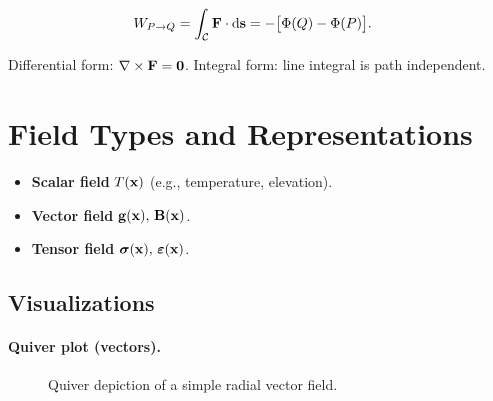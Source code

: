 \documentclass[11pt,a4paper]{article}
\begin{document}
\begin{align}
  W_{P\to Q} &= \int_{\mathcal{C}} \vb{F}\cdot\dd{\vb{s}} = -\big[\Phi(Q)-\Phi(P)\big].
\end{align}

Differential form: $\nabla\times\vb{F}=\vb{0}$. Integral form: line integral is path independent.

\section{Field Types and Representations}
\begin{itemize}
  \item \textbf{Scalar field} $T(\vb{x})$ (e.g., temperature, elevation).
  \item \textbf{Vector field} $\vb{g}(\vb{x}),\,\vb{B}(\vb{x})$.
  \item \textbf{Tensor field} $\bm{\sigma}(\vb{x}),\,\bm{\varepsilon}(\vb{x})$.
\end{itemize}

\subsection{Visualizations}
\paragraph{Quiver plot (vectors).}
\begin{figure}[h]
  \centering
  \caption{Quiver depiction of a simple radial vector field.}
\end{figure}
\end{document}
